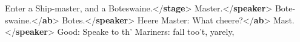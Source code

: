 \begin{shaded}
\hspace*{1em}\hspace*{1em}\hspace*{1em}\hspace*{1em} Enter a Ship-master, and a Boteswaine.{</\textbf{stage}>}\mbox{}\newline 
\hspace*{1em}\mbox{}\newline 
\hspace*{1em}\hspace*{1em}Master.{</\textbf{speaker}>}\mbox{}\newline 
\hspace*{1em}\hspace*{1em}Bote-swaine.{</\textbf{ab}>}\mbox{}\newline 
\hspace*{1em}\mbox{}\newline 
\hspace*{1em}\mbox{}\newline 
\hspace*{1em}\hspace*{1em}Botes.{</\textbf{speaker}>}\mbox{}\newline 
\hspace*{1em}\hspace*{1em}Heere Master: What cheere?{</\textbf{ab}>}\mbox{}\newline 
\hspace*{1em}\mbox{}\newline 
\hspace*{1em}\mbox{}\newline 
\hspace*{1em}\hspace*{1em}Mast.{</\textbf{speaker}>}\mbox{}\newline 
\hspace*{1em}\hspace*{1em}Good: Speake to th' Mariners: fall too't, yarely,\mbox{}\newline 

\end{shaded}
